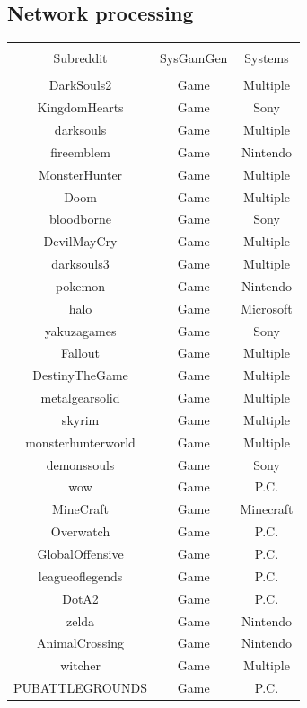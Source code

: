 \documentclass[12pt, a4paper]{article}
\begin{document}
\subsection{Network processing}
\begin{table}
  \centering
    \begin{tabular} {c c c}
      \hline \\
      Subreddit & SysGamGen & Systems \\
      \hline \\
      DarkSouls2 & Game & Multiple \\
      KingdomHearts & Game & Sony \\
      darksouls & Game & Multiple \\
      fireemblem & Game & Nintendo \\
      MonsterHunter & Game & Multiple \\
      Doom & Game & Multiple \\
      bloodborne & Game & Sony \\
      DevilMayCry & Game & Multiple \\
      darksouls3 & Game & Multiple \\
      pokemon & Game & Nintendo \\
      halo & Game & Microsoft \\
      yakuzagames & Game & Sony \\
      Fallout & Game & Multiple \\
      DestinyTheGame & Game & Multiple \\
      metalgearsolid & Game & Multiple \\
      skyrim & Game & Multiple \\
      monsterhunterworld & Game & Multiple \\
      demonssouls & Game & Sony \\
      wow & Game & P.C. \\
      MineCraft & Game & Minecraft \\
      Overwatch & Game & P.C. \\
      GlobalOffensive & Game & P.C. \\
      leagueoflegends & Game & P.C. \\
      DotA2 & Game & P.C. \\
      zelda & Game & Nintendo \\
      AnimalCrossing & Game & Nintendo \\
      witcher & Game & Multiple \\
      PUBATTLEGROUNDS & Game & P.C. \\

\end{tabular}
\end{table}
\end{document}
